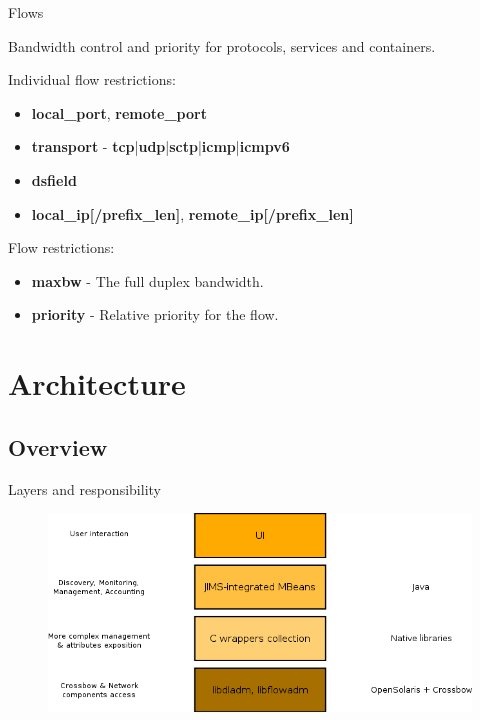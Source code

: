 \documentclass{beamer}
\begin{document}
		\begin{frame}{Flows}

			Bandwidth control and priority for protocols, services and containers.

			\medskip

			Individual flow restrictions:

			\begin{itemize}
				\item \textbf{local\_port}, \textbf{remote\_port}
				\item \textbf{transport} - \textbf{tcp}|\textbf{udp}|\textbf{sctp}|\textbf{icmp}|\textbf{icmpv6}
				\item \textbf{dsfield}
				\item \textbf{local\_ip[/prefix\_len]}, \textbf{remote\_ip[/prefix\_len]}
			\end{itemize}

			\medskip

			Flow restrictions:

			\begin{itemize}
				\item \textbf{maxbw} - The full duplex bandwidth.
				\item \textbf{priority} - Relative priority for the flow.
			\end{itemize}

		\end{frame}


\section{Architecture}

	\subsection{Overview}

		\begin{frame}{Layers and responsibility}

			\begin{figure}[H]
				\includegraphics[width=\textwidth]{img/layers.png}
			\end{figure}
			
		\end{frame}
	
\end{document}
